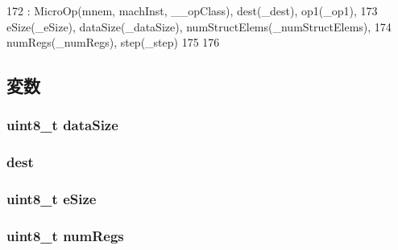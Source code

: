 \begin{DoxyCode}
172         : MicroOp(mnem, machInst, __opClass), dest(_dest), op1(_op1),
173           eSize(_eSize), dataSize(_dataSize), numStructElems(_numStructElems),
174           numRegs(_numRegs), step(_step)
175     {
176     }
\end{DoxyCode}


\subsection{変数}
\hypertarget{classArmISA_1_1MicroNeonMixOp64_af13e629a2f79d14821c7b9246ef99e9f}{
\subsubsection[{dataSize}]{\setlength{\rightskip}{0pt plus 5cm}uint8\_\-t {\bf dataSize}}}
\label{classArmISA_1_1MicroNeonMixOp64_af13e629a2f79d14821c7b9246ef99e9f}
\hypertarget{classArmISA_1_1MicroNeonMixOp64_a6563276134c2f303bab0c30e83e02220}{
\subsubsection[{dest}]{ {\bf dest}}}
\label{classArmISA_1_1MicroNeonMixOp64_a6563276134c2f303bab0c30e83e02220}
\hypertarget{classArmISA_1_1MicroNeonMixOp64_aac129ded07ba57383c5e2540f22c94ef}{
\subsubsection[{eSize}]{\setlength{\rightskip}{0pt plus 5cm}uint8\_\-t {\bf eSize}}}
\label{classArmISA_1_1MicroNeonMixOp64_aac129ded07ba57383c5e2540f22c94ef}
\hypertarget{classArmISA_1_1MicroNeonMixOp64_a7a5268882c913c394a8ad4d988eb94e6}{
\subsubsection[{numRegs}]{\setlength{\rightskip}{0pt plus 5cm}uint8\_\-t {\bf numRegs}}}
